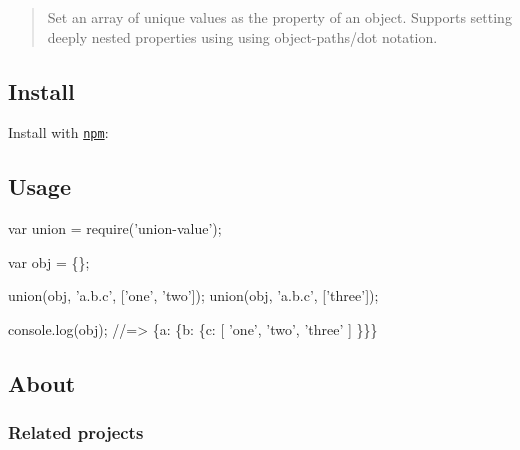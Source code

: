 \begin{quote}
Set an array of unique values as the property of an object. Supports setting deeply nested properties using using object-\/paths/dot notation. \end{quote}


\subsection*{Install}

Install with \href{https://www.npmjs.com/}{\tt npm}\+:




\subsection*{Usage}


\begin{DoxyCode}
var union = require('union-value');

var obj = \{\};

union(obj, 'a.b.c', ['one', 'two']);
union(obj, 'a.b.c', ['three']);

console.log(obj);
//=> \{a: \{b: \{c: [ 'one', 'two', 'three' ] \}\}\}
\end{DoxyCode}


\subsection*{About}

\subsubsection*{Related projects}


